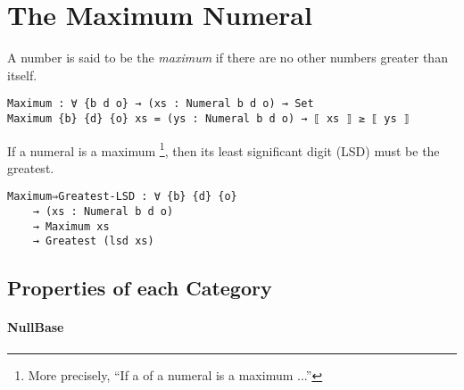 \documentclass[\main/thesis.tex]{subfiles}
\begin{document}
\section{The Maximum Numeral}\label{maximum}

A number is said to be the \textit{maximum} if there are no other numbers
greater than itself.

\begin{lstlisting}
Maximum : ∀ {b d o} → (xs : Numeral b d o) → Set
Maximum {b} {d} {o} xs = (ys : Numeral b d o) → ⟦ xs ⟧ ≥ ⟦ ys ⟧
\end{lstlisting}

If a numeral is a maximum
\footnote{More precisely, ``If a  of a numeral is a maximum ...''},
then its least significant digit (LSD) must be the greatest.

\begin{lstlisting}
Maximum⇒Greatest-LSD : ∀ {b} {d} {o}
    → (xs : Numeral b d o)
    → Maximum xs
    → Greatest (lsd xs)
\end{lstlisting}

\subsection{Properties of each Category}

\paragraph{NullBase}

\begin{center}
    \begin{adjustbox}{max width=\textwidth}
    \end{adjustbox}
\end{center}
\end{document}

